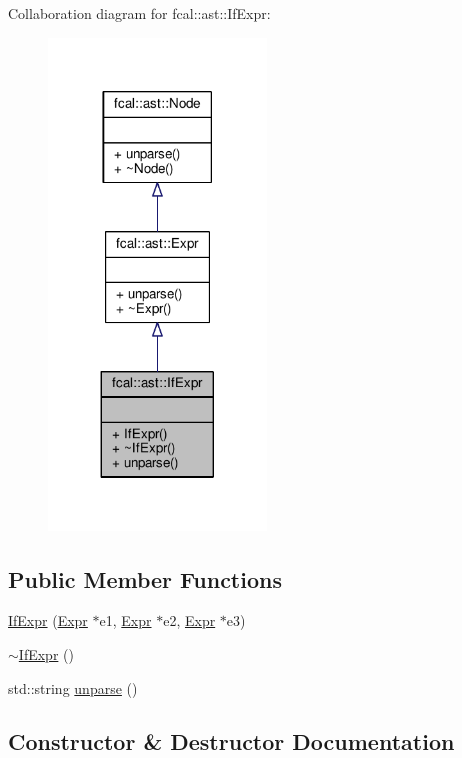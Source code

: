 Collaboration diagram for fcal\+:\+:ast\+:\+:If\+Expr\+:
\nopagebreak
\begin{figure}[H]
\begin{center}
\leavevmode
\includegraphics[width=164pt]{classfcal_1_1ast_1_1IfExpr__coll__graph}
\end{center}
\end{figure}
\subsection*{Public Member Functions}
\begin{DoxyCompactItemize}
\item 
\hyperlink{classfcal_1_1ast_1_1IfExpr_ae0ef7ebf56856f692bbd00cb9a226a26}{If\+Expr} (\hyperlink{classfcal_1_1ast_1_1Expr}{Expr} $\ast$e1, \hyperlink{classfcal_1_1ast_1_1Expr}{Expr} $\ast$e2, \hyperlink{classfcal_1_1ast_1_1Expr}{Expr} $\ast$e3)
\item 
\hyperlink{classfcal_1_1ast_1_1IfExpr_abde8683dfdd858d2f3630f5a13e2f345}{$\sim$\+If\+Expr} ()
\item 
std\+::string \hyperlink{classfcal_1_1ast_1_1IfExpr_a4092cf20150a2cde02364d4c7233e558}{unparse} ()
\end{DoxyCompactItemize}


\subsection{Constructor \& Destructor Documentation}
